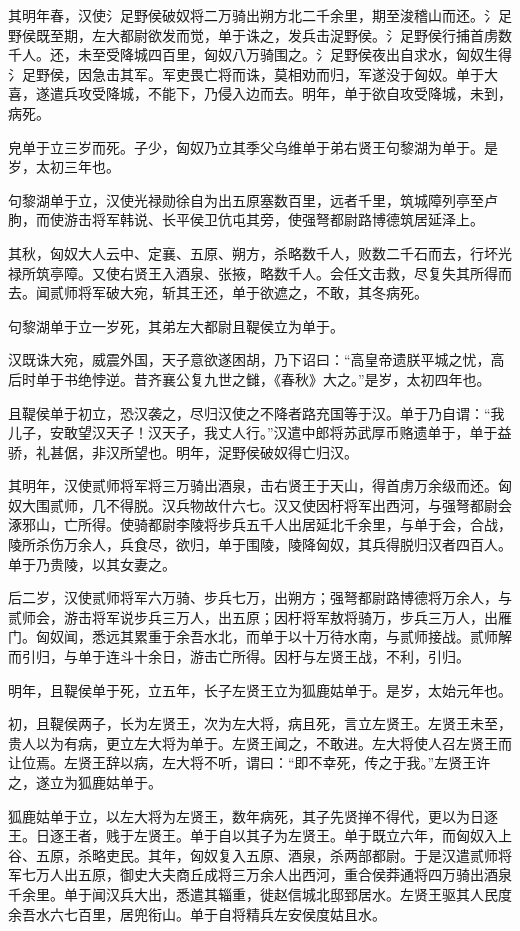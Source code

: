 \documentclass[]{article}
\begin{document}
其明年春，汉使氵足野侯破奴将二万骑出朔方北二千余里，期至浚稽山而还。氵足野侯既至期，左大都尉欲发而觉，单于诛之，发兵击浞野侯。氵足野侯行捕首虏数千人。还，未至受降城四百里，匈奴八万骑围之。氵足野侯夜出自求水，匈奴生得氵足野侯，因急击其军。军吏畏亡将而诛，莫相劝而归，军遂没于匈奴。单于大喜，遂遣兵攻受降城，不能下，乃侵入边而去。明年，单于欲自攻受降城，未到，病死。

皃单于立三岁而死。子少，匈奴乃立其季父乌维单于弟右贤王句黎湖为单于。是岁，太初三年也。

句黎湖单于立，汉使光禄勋徐自为出五原塞数百里，远者千里，筑城障列亭至卢朐，而使游击将军韩说、长平侯卫伉屯其旁，使强弩都尉路博德筑居延泽上。

其秋，匈奴大人云中、定襄、五原、朔方，杀略数千人，败数二千石而去，行坏光禄所筑亭障。又使右贤王入酒泉、张掖，略数千人。会任文击救，尽复失其所得而去。闻贰师将军破大宛，斩其王还，单于欲遮之，不敢，其冬病死。

句黎湖单于立一岁死，其弟左大都尉且鞮侯立为单于。

汉既诛大宛，威震外国，天子意欲遂困胡，乃下诏曰：``高皇帝遗朕平城之忧，高后时单于书绝悖逆。昔齐襄公复九世之雠，《春秋》大之。''是岁，太初四年也。

且鞮侯单于初立，恐汉袭之，尽归汉使之不降者路充国等于汉。单于乃自谓：``我儿子，安敢望汉天子！汉天子，我丈人行。''汉遣中郎将苏武厚币赂遗单于，单于益骄，礼甚倨，非汉所望也。明年，浞野侯破奴得亡归汉。

其明年，汉使贰师将军将三万骑出酒泉，击右贤王于天山，得首虏万余级而还。匈奴大围贰师，几不得脱。汉兵物故什六七。汉又使因杅将军出西河，与强弩都尉会涿邪山，亡所得。使骑都尉李陵将步兵五千人出居延北千余里，与单于会，合战，陵所杀伤万余人，兵食尽，欲归，单于围陵，陵降匈奴，其兵得脱归汉者四百人。单于乃贵陵，以其女妻之。

后二岁，汉使贰师将军六万骑、步兵七万，出朔方；强弩都尉路博德将万余人，与贰师会，游击将军说步兵三万人，出五原；因杅将军敖将骑万，步兵三万人，出雁门。匈奴闻，悉远其累重于余吾水北，而单于以十万待水南，与贰师接战。贰师解而引归，与单于连斗十余日，游击亡所得。因杅与左贤王战，不利，引归。

明年，且鞮侯单于死，立五年，长子左贤王立为狐鹿姑单于。是岁，太始元年也。

初，且鞮侯两子，长为左贤王，次为左大将，病且死，言立左贤王。左贤王未至，贵人以为有病，更立左大将为单于。左贤王闻之，不敢进。左大将使人召左贤王而让位焉。左贤王辞以病，左大将不听，谓曰：``即不幸死，传之于我。''左贤王许之，遂立为狐鹿姑单于。

狐鹿姑单于立，以左大将为左贤王，数年病死，其子先贤掸不得代，更以为日逐王。日逐王者，贱于左贤王。单于自以其子为左贤王。单于既立六年，而匈奴入上谷、五原，杀略吏民。其年，匈奴复入五原、酒泉，杀两部都尉。于是汉遣贰师将军七万人出五原，御史大夫商丘成将三万余人出西河，重合侯莽通将四万骑出酒泉千余里。单于闻汉兵大出，悉遣其辎重，徙赵信城北邸郅居水。左贤王驱其人民度余吾水六七百里，居兜衔山。单于自将精兵左安侯度姑且水。
\end{document}
